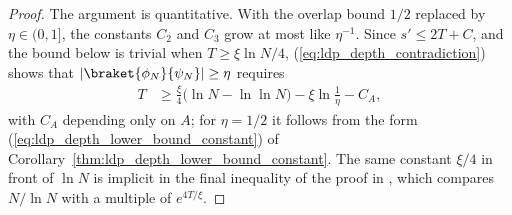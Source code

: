 \begin{proof}
    The argument is quantitative. With the overlap bound $1/2$ replaced by
    $\eta\in(0,1]$, the constants $C_2$ and $C_3$ grow at most like
    $\eta^{-1}$. Since $s'\le2T+C$, and the bound below is trivial when
    $T\ge\xi\ln N/4$, (\ref{eq:ldp_depth_contradiction}) shows that
    $\lvert\braket{\phi_N}{\psi_N}\rvert\ge\eta$ requires
    \begin{align}
        T
         & \ge\frac\xi4\bigl(\ln N-\ln\ln N\bigr)-\xi\ln\frac1\eta-C_A,
        \label{eq:ldp_depth_constant}
    \end{align}
    with $C_A$ depending only on $A$; for $\eta=1/2$ it follows from the form
    (\ref{eq:ldp_depth_lower_bound_constant}) of
    Corollary~\ref{thm:ldp_depth_lower_bound_constant}. The same constant
    $\xi/4$ in front of
    $\ln N$ is implicit in the final inequality of the proof in
    \cite{Malz2024Preparation}, which compares $N/\ln N$ with a multiple of
    $e^{4T/\xi}$.
\end{proof}

